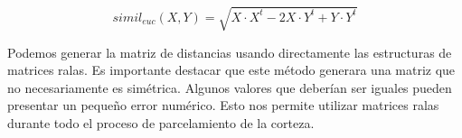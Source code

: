 \begin{equation}
\label{eq:simileuc}
simil_{euc}(X,Y) = \sqrt{X \cdot X^t - 2 X \cdot Y^t + Y \cdot Y^t} 
\end{equation}

Podemos generar la matriz de distancias usando directamente las estructuras
de matrices ralas. Es importante destacar que este m\'etodo generara una
matriz que no necesariamente es sim\'etrica. Algunos valores que deber\'ian
ser iguales pueden presentar un peque\~no error num\'erico. Esto nos
permite utilizar matrices ralas durante todo el proceso de parcelamiento de
la corteza. \\


